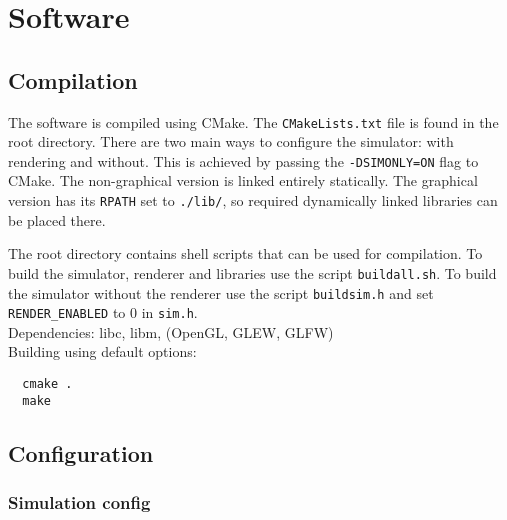 \documentclass[12pt]{article}
\begin{document}
\section{Software}

\subsection{Compilation}

The software is compiled using CMake. The \verb|CMakeLists.txt| file is found in the root directory. There are two main ways to configure the simulator: with rendering and without. This is achieved by passing the \verb|-DSIMONLY=ON| flag to CMake. The non-graphical version is linked entirely statically. The graphical version has its \verb|RPATH| set to \verb|./lib/|, so required dynamically linked libraries can be placed there.

The root directory contains shell scripts that can be used for compilation. To build the simulator, renderer and libraries use the script \verb|buildall.sh|. To build the simulator without the renderer use the script \verb|buildsim.h| and set \verb|RENDER_ENABLED| to 0 in \verb|sim.h|.\\

Dependencies: libc, libm, (OpenGL, GLEW, GLFW)\\

Building using default options:

\begin{verbatim}
  cmake .
  make
\end{verbatim}

\subsection{Configuration}

\subsubsection{Simulation config}
\end{document}
